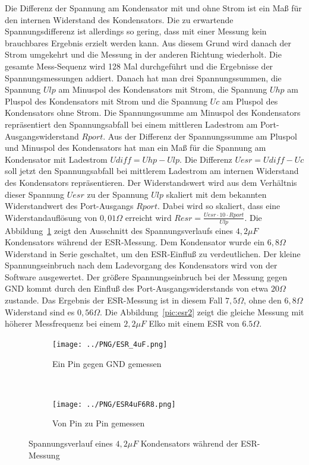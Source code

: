 Die Differenz der Spannung am Kondensator mit und ohne Strom ist ein Maß für den internen Widerstand des Kondensators.
Die zu erwartende Spannungsdifferenz ist allerdings so gering, dass mit einer Messung kein brauchbares Ergebnis erzielt
werden kann.
Aus diesem Grund wird danach der Strom umgekehrt und die Messung in der anderen Richtung wiederholt.
Die gesamte Mess-Sequenz wird 128 Mal durchgeführt und die Ergebnisse der Spannungsmessungen addiert.
Danach hat man drei Spannungssummen, die Spannung \(Ulp\) am Minuspol des Kondensators mit Strom, die Spannung \(Uhp\) am
Pluspol des Kondensators mit Strom und die Spannung \(Uc\) am Pluspol des Kondensators ohne Strom.
Die Spannungssumme am Minuspol des Kondensators repräsentiert den Spannungsabfall bei einem mittleren
Ladestrom am Port-Ausgangswiderstand \(Rport\). Aus der Differenz der Spannungssumme am Pluspol und Minuspol des Kondensators
hat man ein Maß für die Spannung am Kondensator mit Ladestrom \(Udiff = Uhp - Ulp\).
Die Differenz \(Uesr = Udiff - Uc\) soll jetzt den Spannungsabfall bei mittlerem Ladestrom am internen Widerstand des Kondensators
repräsentieren.
Der Widerstandswert wird aus dem Verhältnis dieser Spannung \(Uesr\) zu der Spannung \(Ulp\) skaliert mit dem
bekannten Widerstandwert des Port-Ausgangs \(Rport\). Dabei wird so skaliert, dass eine Widerstandauflösung von
\(0,01 \Omega\) erreicht wird \(Resr = \frac{Uesr \cdot 10 \cdot Rport}{Ulp}\).
Die Abbildung~\ref{pic:esr4} zeigt den Ausschnitt des Spannungsverlaufs eines \(4,2\mu F\) Kondensators
 während der ESR-Messung. Dem Kondensator wurde ein \(6,8 \Omega\) Widerstand in Serie geschaltet, um den ESR-Einfluß
zu verdeutlichen. Der kleine Spannungseinbruch nach dem Ladevorgang des Kondensators wird von der Software ausgewertet.
Der größere Spannungseinbruch bei der Messung gegen GND kommt durch den Einfluß des Port-Ausgangswiderstands von etwa \(20\Omega\) zustande.
Das Ergebnis der ESR-Messung ist in diesem Fall \(7,5 \Omega\), ohne den \(6,8 \Omega\) Widerstand sind es \(0,56\Omega\).
Die Abbildung~\ref{pic:esr2} zeigt die gleiche Messung mit höherer Messfrequenz bei einem \(2,2\mu F\) Elko mit einem ESR von \(6.5\Omega\).


\begin{figure}[H]
  \begin{subfigure}[b]{9cm}
    \centering
    \texttt{[image: ../PNG/ESR\_4uF.png]}
    \caption{Ein Pin gegen GND gemessen}
  \end{subfigure}
  ~
  \begin{subfigure}[b]{9cm}
    \centering
    \texttt{[image: ../PNG/ESR4uF6R8.png]}
    \caption{Von Pin zu Pin gemessen}
  \end{subfigure}
  \caption{Spannungsverlauf eines \(4,2\mu F\) Kondensators während der ESR-Messung}
  \label{pic:esr4}
\end{figure}

